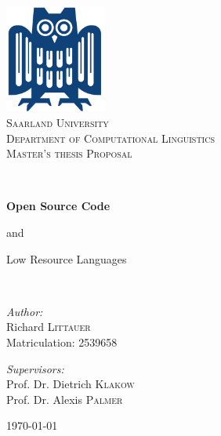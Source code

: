 \documentclass[12pt,a4paper]{article}
\author{Richard Littauer}
\begin{document}
\begin{titlepage}
	\begin{center}

		\includegraphics[width=0.25\textwidth]{img/eule.png}~\\[1cm]

		\textsc{\LARGE Saarland  University}\\[0.4cm]
		\textsc{\Large Department of Computational Linguistics}\\[1.5cm]

		\textsc{\LARGE Master's thesis Proposal}\vspace{0.5cm}

		\HRule \\[0.55cm]

		{ \huge \bfseries Open Source Code

			 and\vspace{0.2cm}

			 Low Resource Languages}\vspace{0.5cm}

		\HRule \\[1.5cm]

		\begin{minipage}{0.45\textwidth}
			\begin{flushleft} \large
				\emph{Author:}\\
				Richard \textsc{Littauer}\\
				Matriculation: 2539658
			\end{flushleft}
		\end{minipage}
		\begin{minipage}{0.45\textwidth}
			\begin{flushright} \large
				\emph{Supervisors:} \\
				Prof. Dr. Dietrich \textsc{Klakow}\\
				Prof. Dr. Alexis \textsc{Palmer}\\
			\end{flushright}
		\end{minipage}

		\vfill

		{\large \today}

	\end{center}
\end{titlepage}
\newpage
\end{document}
